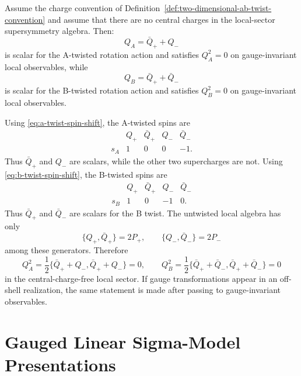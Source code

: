 \begin{remark}
\label{rem:two-dimensional-ab-twist-scalar-supercharges}
Assume the charge convention of
Definition~\ref{def:two-dimensional-ab-twist-convention} and assume that
there are no central charges in the local-sector supersymmetry algebra.
Then:
\begin{equation}
  Q_A=\bar Q_+ + Q_-
  \label{eq:a-twist-scalar-supercharge}
\end{equation}
is scalar for the A-twisted rotation action and satisfies \(Q_A^2=0\) on
gauge-invariant local observables, while
\begin{equation}
  Q_B=\bar Q_+ + \bar Q_-
  \label{eq:b-twist-scalar-supercharge}
\end{equation}
is scalar for the B-twisted rotation action and satisfies \(Q_B^2=0\) on
gauge-invariant local observables.

Using \eqref{eq:a-twist-spin-shift}, the A-twisted spins are
\[
\begin{array}{c|rrrr}
  & Q_+ & \bar Q_+ & Q_- & \bar Q_-\\ \hline
  s_A & 1 & 0 & 0 & -1 .
\end{array}
\]
Thus \(\bar Q_+\) and \(Q_-\) are scalars, while the other two supercharges
are not.  Using \eqref{eq:b-twist-spin-shift}, the B-twisted spins are
\[
\begin{array}{c|rrrr}
  & Q_+ & \bar Q_+ & Q_- & \bar Q_-\\ \hline
  s_B & 1 & 0 & -1 & 0 .
\end{array}
\]
Thus \(\bar Q_+\) and \(\bar Q_-\) are scalars for the B twist.  The
untwisted local algebra has only
\[
  \{Q_+,\bar Q_+\}=2P_+,\qquad
  \{Q_-,\bar Q_-\}=2P_-
\]
among these generators.  Therefore
\[
  Q_A^2=\frac12\{\bar Q_+ + Q_-,\bar Q_+ + Q_-\}=0,
  \qquad
  Q_B^2=\frac12\{\bar Q_+ + \bar Q_-,\bar Q_+ + \bar Q_-\}=0
\]
in the central-charge-free local sector.  If gauge transformations appear in
an off-shell realization, the same statement is made after passing to
gauge-invariant observables.
\end{remark}

\section{Gauged Linear Sigma-Model Presentations}

